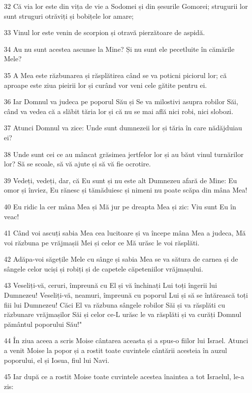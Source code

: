 \par 32 Că via lor este din vița de vie a Sodomei și din șesurile Gomorei; strugurii lor sunt struguri otrăviți și bobițele lor amare;
\par 33 Vinul lor este venin de scorpion și otravă pierzătoare de aspidă.
\par 34 Au nu sunt acestea ascunse la Mine? Și nu sunt ele pecetluite în cămările Mele?
\par 35 A Mea este răzbunarea și răsplătirea când se va poticni piciorul lor; că aproape este ziua pieirii lor și curând vor veni cele gătite pentru ei.
\par 36 Iar Domnul va judeca pe poporul Său și Se va milostivi asupra robilor Săi, când va vedea că a slăbit tăria lor și că nu se mai află nici robi, nici slobozi.
\par 37 Atunci Domnul va zice: Unde sunt dumnezeii lor și tăria în care nădăjduiau ei?
\par 38 Unde sunt cei ce au mâncat grăsimea jertfelor lor și au băut vinul turnărilor lor? Să se scoale, să vă ajute și să vă fie ocrotire.
\par 39 Vedeți, vedeți, dar, că Eu sunt și nu este alt Dumnezeu afară de Mine: Eu omor și înviez, Eu rănesc și tămăduiesc și nimeni nu poate scăpa din mâna Mea!
\par 40 Eu ridic la cer mâna Mea și Mă jur pe dreapta Mea și zic: Viu sunt Eu în veac!
\par 41 Când voi ascuți sabia Mea cea lucitoare și va începe mâna Mea a judeca, Mă voi răzbuna pe vrăjmașii Mei și celor ce Mă urăsc le voi răsplăti.
\par 42 Adăpa-voi săgețile Mele cu sânge și sabia Mea se va sătura de carnea și de sângele celor uciși și robiți și de capetele căpeteniilor vrăjmașului.
\par 43 Veseliți-vă, ceruri, împreună cu El și vă închinați Lui toți îngerii lui Dumnezeu! Veseliți-vă, neamuri, împreună cu poporul Lui și să se întărească toți fiii lui Dumnezeu! Căci El va răzbuna sângele robilor Săi și va răsplăti cu răzbunare vrăjmașilor Săi și celor ce-L urăsc le va răsplăti și va curăți Domnul pământul poporului Său!"
\par 44 În ziua aceea a scris Moise cântarea aceasta și a spus-o fiilor lui Israel. Atunci a venit Moise la popor și a rostit toate cuvintele cântării acesteia în auzul poporului, el și Iosua, fiul lui Navi.
\par 45 Iar după ce a rostit Moise toate cuvintele acestea înaintea a tot Israelul, le-a zis:

